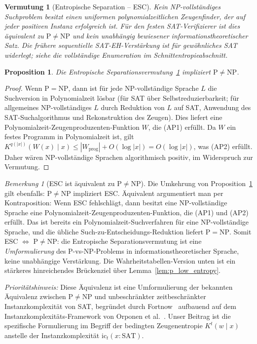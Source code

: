 \documentclass[aps,prd,twocolumn,superscriptaddress,nofootinbib]{revtex4-2}
\newtheorem{proposition}[theorem]{Proposition}
\newtheorem{conjecture}[theorem]{Vermutung}
\theoremstyle{definition}
\theoremstyle{remark}
\newtheorem{remark}[theorem]{Bemerkung}
\newcommand{\NP}{\mathrm{NP}}
\newcommand{\PP}{\mathrm{P}}
\begin{document}
\begin{conjecture}[Entropische Separation -- ESC]
\label{conj:entropic}
Kein NP-vollständiges Suchproblem besitzt einen uniformen
polynomialzeitlichen Zeugenfinder, der auf jeder positiven Instanz
erfolgreich ist. Für den festen SAT-Verifizierer ist dies
äquivalent zu $\PP\ne\NP$ und kein unabhängig bewiesener
informationstheoretischer Satz. Die frühere sequentielle
SAT-EH-Verstärkung ist für gewöhnliches SAT widerlegt;
siehe die vollständige Enumeration im Schnittentropieabschnitt.
\end{conjecture}

\begin{proposition}
\label{prop:equiv}
Die Entropische Separationsvermutung~\ref{conj:entropic} impliziert $\PP \neq \NP$.
\end{proposition}

\begin{proof}
Wenn $\PP = \NP$, dann ist für jede NP-vollständige Sprache $L$ die Suchversion in Polynomialzeit lösbar (für SAT über Selbstreduzierbarkeit; für allgemeines NP-vollständiges $L$ durch Reduktion von $L$ auf SAT, Anwendung des SAT-Suchalgorithmus und Rekonstruktion des Zeugen). Dies liefert eine Polynomialzeit-Zeugenproduzenten-Funktion $W$, die (AP1) erfüllt. Da $W$ ein festes Programm in Polynomialzeit ist, gilt $K^{q(|x|)}(W(x) \mid x) \leq |W_{\text{prog}}| + O(\log|x|) = O(\log|x|)$, was (AP2) erfüllt. Daher wären NP-vollständige Sprachen algorithmisch positiv, im Widerspruch zur Vermutung.
\end{proof}

\begin{remark}[ESC ist äquivalent zu $\PP \neq \NP$]
\label{rem:esc-equivalence}
Die Umkehrung von Proposition~\ref{prop:equiv} gilt ebenfalls: $\PP \neq \NP$ impliziert ESC. Äquivalent argumentiert man per Kontraposition: Wenn ESC fehlschlägt, dann besitzt eine NP-vollständige Sprache eine Polynomialzeit-Zeugenproduzenten-Funktion, die (AP1) und (AP2) erfüllt. Das ist bereits ein Polynomialzeit-Suchverfahren für eine NP-vollständige Sprache, und die übliche Such-zu-Entscheidungs-Reduktion liefert $\PP=\NP$. Somit ESC $\Leftrightarrow$ $\PP \neq \NP$: die Entropische Separationsvermutung ist eine \textit{Umformulierung} des P-vs-NP-Problems in informationstheoretischer Sprache, keine unabhängige Verstärkung. Die Wahrheitstabellen-Version unten ist ein stärkeres hinreichendes Brückenziel über Lemma~\ref{lem:p_low_entropy}.


\textit{Prioritätshinweis:} Diese Äquivalenz ist eine Umformulierung der bekannten Äquivalenz zwischen $\PP \neq \NP$ und unbeschränkter zeitbeschränkter Instanzkomplexität von SAT, begründet durch Fortnow~\cite{Fortnow2000} aufbauend auf dem Instanzkomplexitäts-Framework von Orponen et al.~\cite{OrponenKoSchoeningWatanabe1994}. Unser Beitrag ist die spezifische Formulierung im Begriff der bedingten Zeugenentropie $K^t(w \mid x)$ anstelle der Instanzkomplexität $\mathrm{ic}_t(x : \mathrm{SAT})$.
\end{remark}
\end{document}
